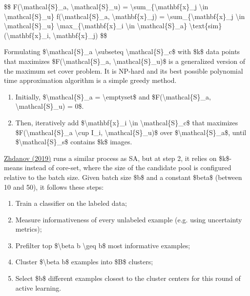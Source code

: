 \$\$ F(\textbackslash mathcal\{S\}\_a, \textbackslash mathcal\{S\}\_u) = \textbackslash sum\_\{\textbackslash mathbf\{x\}\_j \textbackslash in \textbackslash mathcal\{S\}\_u\} f(\textbackslash mathcal\{S\}\_a, \textbackslash mathbf\{x\}\_j) = \textbackslash sum\_\{\textbackslash mathbf\{x\}\_j \textbackslash in \textbackslash mathcal\{S\}\_u\} \textbackslash max\_\{\textbackslash mathbf\{x\}\_i \textbackslash in \textbackslash mathcal\{S\}\_a\} \textbackslash text\{sim\}(\textbackslash mathbf\{x\}\_i, \textbackslash mathbf\{x\}\_j) \$\$

Formulating \$\textbackslash mathcal\{S\}\_a \textbackslash subseteq \textbackslash mathcal\{S\}\_c\$ with \$k\$ data points that maximizes \$F(\textbackslash mathcal\{S\}\_a, \textbackslash mathcal\{S\}\_u)\$ is a generalized version of the maximum set cover problem. It is NP-hard and its best possible polynomial time approximation algorithm is a simple greedy method.

\begin{enumerate}
\tightlist
\item
  Initially, \$\textbackslash mathcal\{S\}\_a = \textbackslash emptyset\$ and \$F(\textbackslash mathcal\{S\}\_a, \textbackslash mathcal\{S\}\_u) = 0\$.
\item
  Then, iteratively add \$\textbackslash mathbf\{x\}\_i \textbackslash in \textbackslash mathcal\{S\}\_c\$ that maximizes \$F(\textbackslash mathcal\{S\}\_a \textbackslash cup I\_i, \textbackslash mathcal\{S\}\_u)\$ over \$\textbackslash mathcal\{S\}\_a\$, until \$\textbackslash mathcal\{S\}\_s\$ contains \$k\$ images.
\end{enumerate}

\href{https://arxiv.org/abs/1901.05954}{Zhdanov (2019)} runs a similar process as SA, but at step 2, it relies on \$k\$-means instead of core-set, where the size of the candidate pool is configured relative to the batch size. Given batch size \$b\$ and a constant \$beta\$ (between 10 and 50), it follows these steps:

\begin{enumerate}
\tightlist
\item
  Train a classifier on the labeled data;
\item
  Measure informativeness of every unlabeled example (e.g. using uncertainty metrics);
\item
  Prefilter top \$\textbackslash beta b \textbackslash geq b\$ most informative examples;
\item
  Cluster \$\textbackslash beta b\$ examples into \$B\$ clusters;
\item
  Select \$b\$ different examples closest to the cluster centers for this round of active learning.
\end{enumerate}

